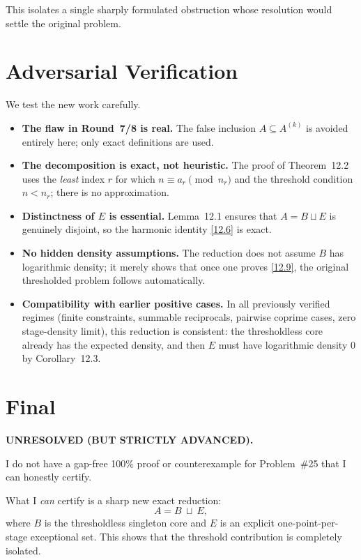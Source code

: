 This isolates a single sharply formulated obstruction whose resolution would settle the original problem.

\section{Adversarial Verification}
We test the new work carefully.
\begin{itemize}
\item \textbf{The flaw in Round~7/8 is real.}  The false inclusion $A\subseteq A^{(k)}$ is avoided entirely here; only exact definitions are used.
\item \textbf{The decomposition is exact, not heuristic.}  The proof of Theorem~12.2 uses the \emph{least} index $r$ for which $n\equiv a_r\pmod{n_r}$ and the threshold condition $n<n_r$; there is no approximation.
\item \textbf{Distinctness of $E$ is essential.}  Lemma~12.1 ensures that $A=B\sqcup E$ is genuinely disjoint, so the harmonic identity \eqref{12.6} is exact.
\item \textbf{No hidden density assumptions.}  The reduction does not assume $B$ has logarithmic density; it merely shows that once one proves \eqref{12.9}, the original thresholded problem follows automatically.
\item \textbf{Compatibility with earlier positive cases.}  In all previously verified regimes (finite constraints, summable reciprocals, pairwise coprime cases, zero stage-density limit), this reduction is consistent: the thresholdless core already has the expected density, and then $E$ must have logarithmic density $0$ by Corollary~12.3.
\end{itemize}

\section{Final}
\textbf{UNRESOLVED (BUT STRICTLY ADVANCED).}

I do not have a gap-free 100\% proof or counterexample for Problem~\#25 that I can honestly certify.

What I \emph{can} certify is a sharp new exact reduction:
\begin{equation}
A = B\ \sqcup\ E,
\tag{12.11}
\end{equation}
where $B$ is the thresholdless singleton core and $E$ is an explicit one-point-per-stage exceptional set.  This shows that the threshold contribution is completely isolated.

